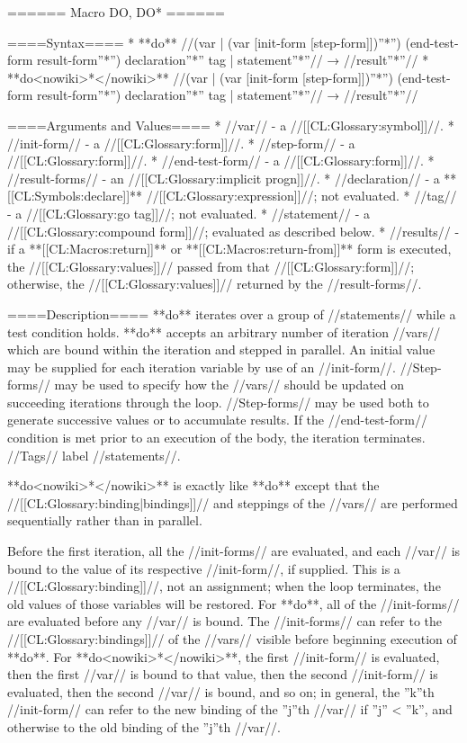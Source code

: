 ====== Macro DO, DO* ======

====Syntax====
  * **do** //({var | (var [init-form [step-form]])}''*'') (end-test-form result-form''*'') declaration''*'' {tag | statement}''*''// → //result''*''//
  * **do<nowiki>*</nowiki>** //({var | (var [init-form [step-form]])}''*'') (end-test-form result-form''*'') declaration''*'' {tag | statement}''*''// → //result''*''//

====Arguments and Values====
  * //var// - a //[[CL:Glossary:symbol]]//.
  * //init-form// - a //[[CL:Glossary:form]]//.
  * //step-form// - a //[[CL:Glossary:form]]//.
  * //end-test-form// - a //[[CL:Glossary:form]]//.
  * //result-forms// - an //[[CL:Glossary:implicit progn]]//.
  * //declaration// - a **[[CL:Symbols:declare]]** //[[CL:Glossary:expression]]//; not evaluated.
  * //tag// - a //[[CL:Glossary:go tag]]//; not evaluated.
  * //statement// - a //[[CL:Glossary:compound form]]//; evaluated as described below.
  * //results// - if a **[[CL:Macros:return]]** or **[[CL:Macros:return-from]]** form is executed, the //[[CL:Glossary:values]]// passed from that //[[CL:Glossary:form]]//; otherwise, the //[[CL:Glossary:values]]// returned by the //result-forms//.

====Description====
**do** iterates over a group of //statements// while a test condition holds. **do** accepts an arbitrary number of iteration //vars// which are bound within the iteration and stepped in parallel. An initial value may be supplied for each iteration variable by use of an //init-form//. //Step-forms// may be used to specify how the //vars// should be updated on succeeding iterations through the loop. //Step-forms// may be used both to generate successive values or to accumulate results. If the //end-test-form// condition is met prior to an execution of the body, the iteration terminates. //Tags// label //statements//.

**do<nowiki>*</nowiki>** is exactly like **do** except that the //[[CL:Glossary:binding|bindings]]// and steppings of the //vars// are performed sequentially rather than in parallel.

Before the first iteration, all the //init-forms// are evaluated, and each //var// is bound to the value of its respective //init-form//, if supplied. This is a //[[CL:Glossary:binding]]//, not an assignment; when the loop terminates, the old values of those variables will be restored. For **do**, all of the //init-forms// are evaluated before any //var// is bound. The //init-forms// can refer to the //[[CL:Glossary:bindings]]// of the //vars// visible before beginning execution of **do**. For **do<nowiki>*</nowiki>**, the first //init-form// is evaluated, then the first //var// is bound to that value, then the second //init-form// is evaluated, then the second //var// is bound, and so on; in general, the ''k''th //init-form// can refer to the new binding of the ''j''th //var// if ''j'' < ''k'', and otherwise to the old binding of the ''j''th //var//.


